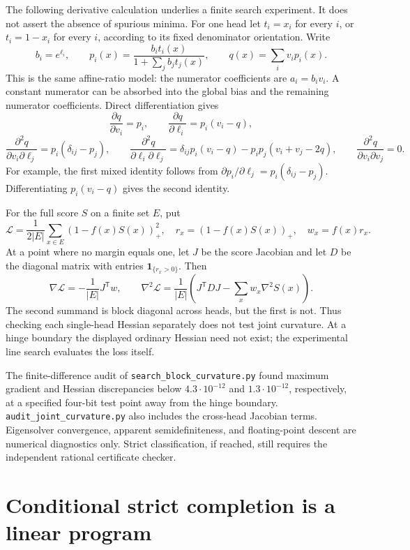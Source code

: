 \documentclass[11pt]{article}
\begin{document}
The following derivative calculation underlies a finite search experiment.
It does not assert the absence of spurious minima. For one head let
$t_i=x_i$ for every $i$, or $t_i=1-x_i$ for every $i$, according to
its fixed denominator orientation. Write
\[
 b_i=e^{\ell_i},\qquad
 p_i(x)=\frac{b_it_i(x)}{1+\sum_jb_jt_j(x)},\qquad
 q(x)=\sum_i v_i p_i(x).
\]
This is the same affine-ratio model: the numerator coefficients are
$a_i=b_iv_i$. A constant numerator can be absorbed into the global
bias and the remaining numerator coefficients. Direct differentiation
gives
\[
 \frac{\partial q}{\partial v_i}=p_i,\qquad
 \frac{\partial q}{\partial\ell_i}=p_i(v_i-q),
\]
\[
 \frac{\partial^2q}{\partial v_i\partial\ell_j}
 =p_i(\delta_{ij}-p_j),\qquad
 \frac{\partial^2q}{\partial\ell_i\partial\ell_j}
 =\delta_{ij}p_i(v_i-q)-p_ip_j(v_i+v_j-2q),
 \qquad \frac{\partial^2q}{\partial v_i\partial v_j}=0.
\]
For example, the first mixed identity follows from
$\partial p_i/\partial\ell_j=p_i(\delta_{ij}-p_j)$.
Differentiating $p_i(v_i-q)$ gives the second identity.

For the full score $S$ on a finite set $E$, put
\[
 \mathcal L=\frac1{2|E|}\sum_{x\in E}(1-f(x)S(x))_+^2,
 \quad r_x=(1-f(x)S(x))_+,
 \quad w_x=f(x)r_x.
\]
At a point where no margin equals one, let $J$ be the score Jacobian
and let $D$ be the diagonal matrix with entries
$\mathbf1_{\{r_x>0\}}$. Then
\[
 \nabla\mathcal L=-\frac1{|E|}J^{\mathsf T}w,
 \qquad
 \nabla^2\mathcal L=\frac1{|E|}
 \left(J^{\mathsf T}DJ-\sum_xw_x\nabla^2S(x)\right).
\]
The second summand is block diagonal across heads, but the first is
not. Thus checking each single-head Hessian separately does not test
joint curvature. At a hinge boundary the displayed ordinary Hessian
need not exist; the experimental line search evaluates the loss itself.

The finite-difference audit of \texttt{search\_block\_curvature.py}
found maximum gradient and Hessian discrepancies below
$4.3\cdot10^{-12}$ and $1.3\cdot10^{-12}$, respectively, at a
specified four-bit test point away from the hinge boundary.
\texttt{audit\_joint\_curvature.py} also includes the cross-head
Jacobian terms. Eigensolver convergence, apparent semidefiniteness,
and floating-point descent are numerical diagnostics only. Strict
classification, if reached, still requires the independent rational
certificate checker.


\section{Conditional strict completion is a linear program}
\end{document}
